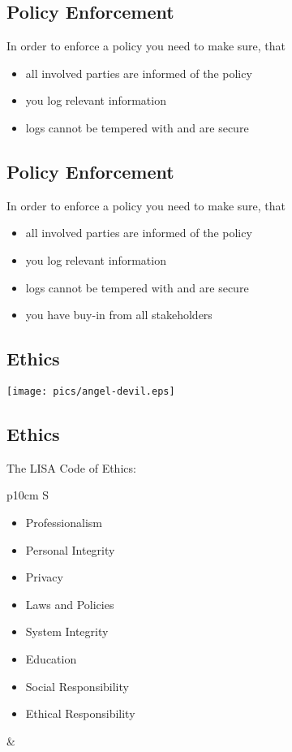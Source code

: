 \documentclass[xga]{xdvislides}
\begin{document}
\subsection{Policy Enforcement}
In order to enforce a policy you need to make sure, that
\begin{itemize}
	\item all involved parties are informed of the policy
	\item you log relevant information
	\item logs cannot be tempered with and are secure
\end{itemize}

\subsection{Policy Enforcement}
In order to enforce a policy you need to make sure, that
\begin{itemize}
	\item all involved parties are informed of the policy
	\item you log relevant information
	\item logs cannot be tempered with and are secure
	\item you have buy-in from all stakeholders
\end{itemize}

\subsection{Ethics}
\begin{center}
	\texttt{[image: pics/angel-devil.eps]}
\end{center}

\subsection{Ethics}
The LISA Code of Ethics:
\\

\begin{tabular}{ p{10cm} S }
\begin{itemize}
	\item Professionalism
	\item Personal Integrity
	\item Privacy
	\item Laws and Policies
	\item System Integrity
	\item Education
	\item Social Responsibility
	\item Ethical Responsibility
\end{itemize}
&  \\
\end{tabular}
\end{document}
